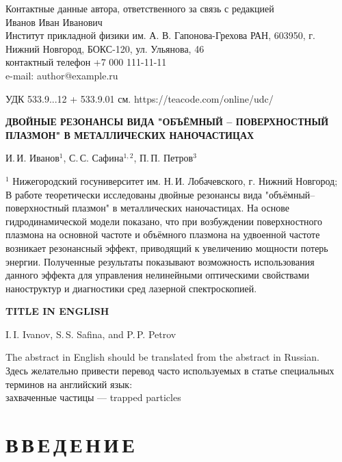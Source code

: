 \documentclass[12pt, a4paper]{article}
\begin{document}
\thispagestyle{empty}

Контактные данные автора, ответственного за связь с редакцией\\
Иванов Иван Иванович\\
Институт прикладной физики им. А. В. Гапонова-Грехова РАН, 603950, г. Нижний Новгород, БОКС-120, ул. Ульянова, 46\\
контактный телефон +7 000 111-11-11\\
e-mail: author@example.ru

\newpage
\setcounter{page}{1}

УДК 533.9...12 + 533.9.01  см. https://teacode.com/online/udc/

{\large\bf ДВОЙНЫЕ РЕЗОНАНСЫ ВИДА "ОБЪЁМНЫЙ -- ПОВЕРХНОСТНЫЙ ПЛАЗМОН" В МЕТАЛЛИЧЕСКИХ НАНОЧАСТИЦАХ}

И.\,И. Иванов$^1$, С.\,С. Сафина$^{1,2}$, П.\,П. Петров$^3$

$^1$ Нижегородский госуниверситет им. Н.\,И. Лобачевского, г. Нижний Новгород;\\


В работе теоретически исследованы двойные резонансы вида "объёмный–поверхностный плазмон" в металлических наночастицах. На основе гидродинамической модели показано, что при возбуждении поверхностного плазмона на основной частоте и объёмного плазмона на удвоенной частоте возникает резонансный эффект, приводящий к увеличению мощности потерь энергии. Полученные результаты показывают возможность использования данного эффекта для управления нелинейными оптическими свойствами наноструктур и диагностики сред лазерной спектроскопией.

\newpage

{\large\bf TITLE IN ENGLISH}

I.\,I. Ivanov, S.\,S. Safina, and P.\,P. Petrov

The abstract in English should be translated from the abstract in Russian.\\

Здесь желательно привести перевод часто используемых в статье специальных терминов на английский язык:\\
захваченные частицы --- trapped particles

\newpage

\section*{В\,В\,Е\,Д\,Е\,Н\,И\,Е}
\end{document}
